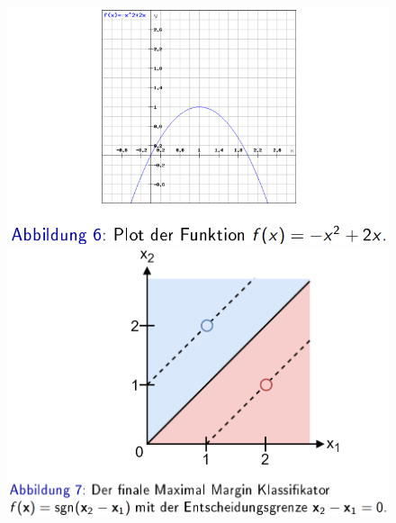 \documentclass{report}
\begin{document}
\begin{figure}[H]
  \centering
  \begin{minipage}[b]{0.4\textwidth}
    \includegraphics[scale=.265]{ml06_6}
  \end{minipage}
  \hfill
  \begin{minipage}[b]{0.4\textwidth}
    \includegraphics[scale=.275]{ml06_7}
  \end{minipage}
\end{figure}
\end{document}
